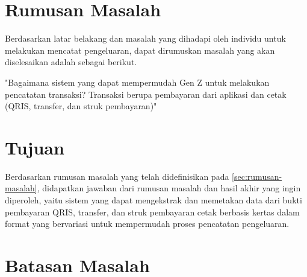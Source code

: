 \section{Rumusan Masalah}
\label{sec:rumusan-masalah}

Berdasarkan latar belakang dan masalah yang dihadapi oleh individu untuk melakukan mencatat pengeluaran, dapat dirumuskan masalah yang akan diselesaikan adalah sebagai berikut.

\begin{center}
	"Bagaimana sistem yang dapat mempermudah Gen Z untuk melakukan pencatatan transaksi? Transaksi berupa pembayaran dari aplikasi dan cetak (QRIS, transfer, dan struk pembayaran)"
\end{center}

\section{Tujuan}
\label{sec:tujuan}

Berdasarkan rumusan masalah yang telah didefinisikan pada \autoref{sec:rumusan-masalah}, didapatkan jawaban dari rumusan masalah dan hasil akhir yang ingin diperoleh, yaitu sistem yang dapat mengekstrak dan memetakan data dari bukti pembayaran QRIS, transfer, dan struk pembayaran cetak berbasis kertas dalam format yang bervariasi untuk mempermudah proses pencatatan pengeluaran.

\section{Batasan Masalah}
\label{sec:batasan-masalah}

